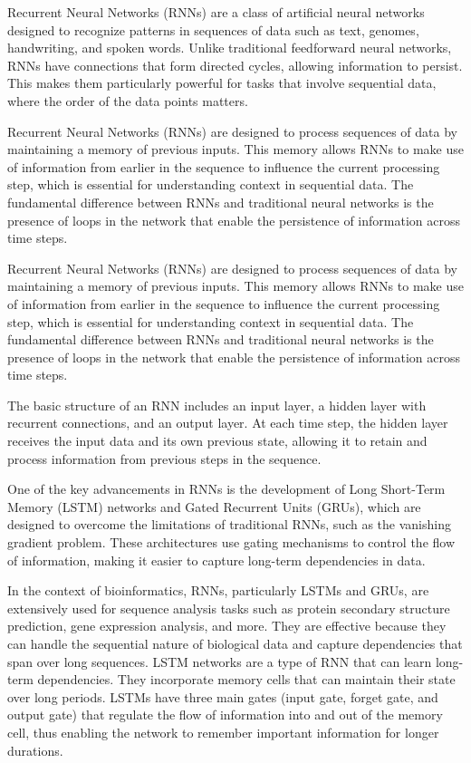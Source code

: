 Recurrent Neural Networks (RNNs) are a class of artificial neural networks designed to recognize patterns in sequences of data such as text, genomes, handwriting, and spoken words. Unlike traditional feedforward neural networks, RNNs have connections that form directed cycles, allowing information to persist. This makes them particularly powerful for tasks that involve sequential data, where the order of the data points matters.

Recurrent Neural Networks (RNNs) are designed to process sequences of data by maintaining a memory of previous inputs. This memory allows RNNs to make use of information from earlier in the sequence to influence the current processing step, which is essential for understanding context in sequential data. The fundamental difference between RNNs and traditional neural networks is the presence of loops in the network that enable the persistence of information across time steps.

Recurrent Neural Networks (RNNs) are designed to process sequences of data by maintaining a memory of previous inputs. This memory allows RNNs to make use of information from earlier in the sequence to influence the current processing step, which is essential for understanding context in sequential data. The fundamental difference between RNNs and traditional neural networks is the presence of loops in the network that enable the persistence of information across time steps.

The basic structure of an RNN includes an input layer, a hidden layer with recurrent connections, and an output layer. At each time step, the hidden layer receives the input data and its own previous state, allowing it to retain and process information from previous steps in the sequence.

One of the key advancements in RNNs is the development of Long Short-Term Memory (LSTM) networks and Gated Recurrent Units (GRUs), which are designed to overcome the limitations of traditional RNNs, such as the vanishing gradient problem. These architectures use gating mechanisms to control the flow of information, making it easier to capture long-term dependencies in data.

In the context of bioinformatics, RNNs, particularly LSTMs and GRUs, are extensively used for sequence analysis tasks such as protein secondary structure prediction, gene expression analysis, and more. They are effective because they can handle the sequential nature of biological data and capture dependencies that span over long sequences. LSTM networks are a type of RNN that can learn long-term dependencies. They incorporate memory cells that can maintain their state over long periods. LSTMs have three main gates (input gate, forget gate, and output gate) that regulate the flow of information into and out of the memory cell, thus enabling the network to remember important information for longer durations. \autocite{hochreiterLongShortTermMemory1997}

